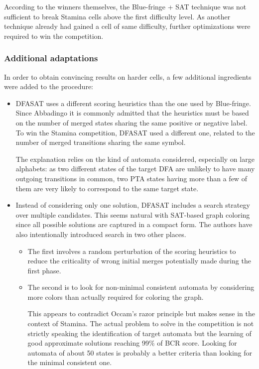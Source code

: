 According to the winners themselves, the Blue-fringe + SAT technique was not sufficient to break Stamina cells above the first difficulty level. As another technique already had gained a cell of same difficulty, further optimizations were required to win the competition.

\subsubsection*{Additional adaptations}

In order to obtain convincing results on harder cells, a few additional ingredients were added to the procedure:

\begin{itemize}
\item DFASAT uses a different scoring heuristics than the one used by Blue-fringe. Since Abbadingo it is commonly admitted that the heuristics must be based on the number of merged states sharing the same positive or negative label. To win the Stamina competition, DFASAT used a different one, related to the number of merged transitions sharing the same symbol. 

The explanation relies on the kind of automata considered, especially on large alphabets: as two different states of the target DFA are unlikely to have many outgoing transitions in common, two PTA states having more than a few of them are very likely to correspond to the same target state.

\item Instead of considering only one solution, DFASAT includes a search strategy over multiple candidates. This seems natural with SAT-based graph coloring since all possible solutions are captured in a compact form. The authors have also intentionally introduced search in two other places. 
\begin{itemize}
\item The first involves a random perturbation of the scoring heuristics to reduce the criticality of wrong initial merges potentially made during the first phase. 
\item The second is to look for non-minimal consistent automata by considering more colors than actually required for coloring the graph. 

This appears to contradict Occam's razor principle but makes sense in the context of Stamina. The actual problem to solve in the competition is not strictly speaking the identification of target automata but the learning of good approximate solutions reaching 99\% of BCR score. Looking for automata of about 50 states is probably a better criteria than looking for the minimal consistent one.
\end{itemize}
\end{itemize}
